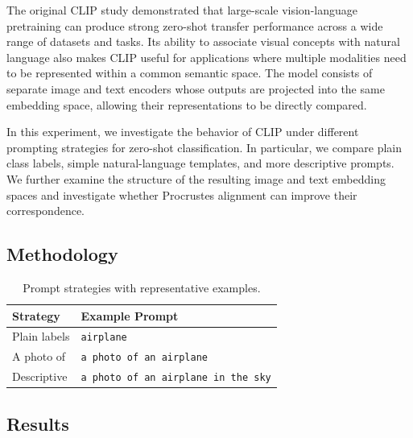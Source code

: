 \documentclass{article}
\begin{document}
The original CLIP study demonstrated that large-scale
vision-language pretraining can produce strong zero-shot transfer
performance across a wide range of datasets and tasks. Its ability to
associate visual concepts with natural language also makes CLIP useful
for applications where multiple modalities need to be represented
within a common semantic space. The model consists of separate image
and text encoders whose outputs are projected into the same embedding
space, allowing their representations to be directly compared.

In this experiment, we investigate the behavior of CLIP under
different prompting strategies for zero-shot classification. In
particular, we compare plain class labels, simple natural-language
templates, and more descriptive prompts. We further examine the
structure of the resulting image and text embedding spaces and
investigate whether Procrustes alignment can improve their
correspondence.

\subsection{Methodology}



\begin{table}[ht]
    \centering
    \caption{Prompt strategies with representative examples.}
    \label{tab:prompt_strategies}
    \small
    \begin{tabular}{lp{}}
        \toprule
        \textbf{Strategy} & \textbf{Example Prompt} \\
        \midrule
        Plain labels
        & \texttt{airplane} \\[2pt]
        A photo of
        & \texttt{a photo of an airplane} \\[2pt]
        Descriptive
        & \texttt{a photo of an airplane in the sky} \\
        \bottomrule
    \end{tabular}
\end{table}

\subsection{Results}

\end{document}
